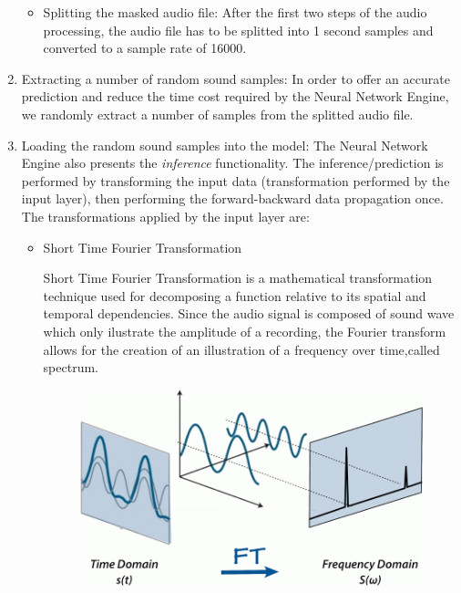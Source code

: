 \begin{enumerate}
\begin{itemize}
			\item Splitting the masked audio file: After the first two steps of the audio processing,
	the audio file has to be splitted into 1 second samples and converted to a sample rate of 16000.
		\end{itemize}

	\item Extracting a number of random sound samples: In order to offer an accurate prediction and reduce the
	time cost required by the Neural Network Engine, we randomly extract a number of samples from the splitted audio
	file.
\item Loading the random sound samples into the model: The Neural Network Engine also presents the \textit{inference}
	functionality. The inference/prediction is performed by transforming the input data (transformation performed
	by the input layer), then performing the forward-backward data propagation once.
	The transformations applied by the input layer are:
	\begin{itemize}

		\item Short Time Fourier Transformation

		Short Time Fourier Transformation is a mathematical transformation technique used for
		decomposing a function relative to its spatial and temporal dependencies. Since the audio signal is
		composed of sound wave which only ilustrate the amplitude of
		a recording, the Fourier transform allows for the creation of an illustration of a frequency
		over time,called spectrum. \cite{ft}

			\begin{figure}[H]
				\centering
				\includegraphics[width = 4.5in]{images/ft.png}
			\centerline{}
			\label{ft}
			\end{figure}



\end{itemize}
\end{enumerate}
